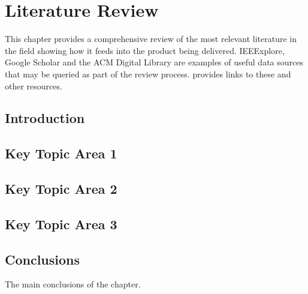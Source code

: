 \chapter{Literature Review}\label{ch:litReview}

This chapter provides a comprehensive review of the most relevant literature in the field showing how it feeds into the product being delivered. IEEExplore, Google Scholar and the ACM Digital Library are examples of useful data sources that may be queried as part of the review process. \cite{online:Doolan:2016:AcademicResources} provides links to these and other resources. 

\section{Introduction}


\section{Key Topic Area 1}


\section{Key Topic Area 2}


\section{Key Topic Area 3}


\section{Conclusions}

The main conclusions of the chapter.


